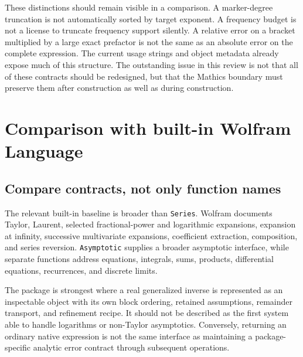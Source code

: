 \documentclass[11pt,letterpaper]{article}
\newcommand{\code}[1]{\texttt{#1}}
\begin{document}
These distinctions should remain visible in a comparison. A marker-degree truncation is not automatically sorted by target exponent. A frequency budget is not a license to truncate frequency support silently. A relative error on a bracket multiplied by a large exact prefactor is not the same as an absolute error on the complete expression. The current usage strings and object metadata already expose much of this structure. The outstanding issue in this review is not that all of these contracts should be redesigned, but that the Mathics boundary must preserve them after construction as well as during construction.

\section{Comparison with built-in Wolfram Language}
\label{sec:comparison}

\subsection{Compare contracts, not only function names}

The relevant built-in baseline is broader than \code{Series}. Wolfram documents Taylor, Laurent, selected fractional-power and logarithmic expansions, expansion at infinity, successive multivariate expansions, coefficient extraction, composition, and series reversion. \code{Asymptotic} supplies a broader asymptotic interface, while separate functions address equations, integrals, sums, products, differential equations, recurrences, and discrete limits.~\cite{wl-series,wl-inverse,wl-asymptotic,wl-guide,wl-discrete}

The package is strongest where a real generalized inverse is represented as an inspectable object with its own block ordering, retained assumptions, remainder transport, and refinement recipe. It should not be described as the first system able to handle logarithms or non-Taylor asymptotics. Conversely, returning an ordinary native expression is not the same interface as maintaining a package-specific analytic error contract through subsequent operations.
\end{document}
